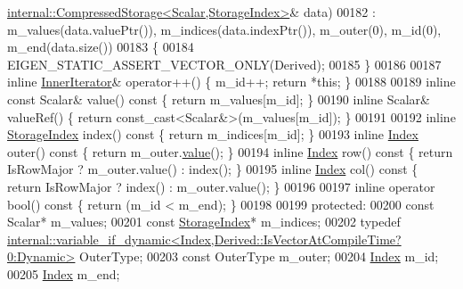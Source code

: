 \begin{DoxyCode}
      \hyperlink{class_eigen_1_1internal_1_1_compressed_storage}{internal::CompressedStorage<Scalar,StorageIndex>}& data)
00182       : m\_values(data.valuePtr()), m\_indices(data.indexPtr()), m\_outer(0), m\_id(0), m\_end(data.size())
00183     \{
00184       EIGEN\_STATIC\_ASSERT\_VECTOR\_ONLY(Derived);
00185     \}
00186 
00187     \textcolor{keyword}{inline} \hyperlink{class_eigen_1_1_inner_iterator}{InnerIterator}& operator++() \{ m\_id++; \textcolor{keywordflow}{return} *\textcolor{keyword}{this}; \}
00188 
00189     \textcolor{keyword}{inline} \textcolor{keyword}{const} Scalar& value()\textcolor{keyword}{ const }\{ \textcolor{keywordflow}{return} m\_values[m\_id]; \}
00190     \textcolor{keyword}{inline} Scalar& valueRef() \{ \textcolor{keywordflow}{return} \textcolor{keyword}{const\_cast<}Scalar&\textcolor{keyword}{>}(m\_values[m\_id]); \}
00191 
00192     \textcolor{keyword}{inline} \hyperlink{group___sparse_core___module_a0b540ba724726ebe953f8c0df06081ed}{StorageIndex} index()\textcolor{keyword}{ const }\{ \textcolor{keywordflow}{return} m\_indices[m\_id]; \}
00193     \textcolor{keyword}{inline} \hyperlink{group___core___module_a554f30542cc2316add4b1ea0a492ff02}{Index} outer()\textcolor{keyword}{ const }\{ \textcolor{keywordflow}{return} m\_outer.\hyperlink{class_eigen_1_1_inner_iterator_ab04bccb41eb22ffcb92dc61125aab119}{value}(); \}
00194     \textcolor{keyword}{inline} \hyperlink{group___core___module_a554f30542cc2316add4b1ea0a492ff02}{Index} row()\textcolor{keyword}{ const }\{ \textcolor{keywordflow}{return} IsRowMajor ? m\_outer.value() : index(); \}
00195     \textcolor{keyword}{inline} \hyperlink{group___core___module_a554f30542cc2316add4b1ea0a492ff02}{Index} col()\textcolor{keyword}{ const }\{ \textcolor{keywordflow}{return} IsRowMajor ? index() : m\_outer.value(); \}
00196 
00197     \textcolor{keyword}{inline} \textcolor{keyword}{operator} bool()\textcolor{keyword}{ const }\{ \textcolor{keywordflow}{return} (m\_id < m\_end); \}
00198 
00199   \textcolor{keyword}{protected}:
00200     \textcolor{keyword}{const} Scalar* m\_values;
00201     \textcolor{keyword}{const} \hyperlink{group___sparse_core___module_a0b540ba724726ebe953f8c0df06081ed}{StorageIndex}* m\_indices;
00202     \textcolor{keyword}{typedef} 
      \hyperlink{class_eigen_1_1internal_1_1variable__if__dynamic}{internal::variable\_if\_dynamic<Index,Derived::IsVectorAtCompileTime?0:Dynamic>}
       OuterType;
00203     \textcolor{keyword}{const} OuterType m\_outer;
00204     \hyperlink{group___core___module_a554f30542cc2316add4b1ea0a492ff02}{Index} m\_id;
00205     \hyperlink{group___core___module_a554f30542cc2316add4b1ea0a492ff02}{Index} m\_end;

\end{DoxyCode}
